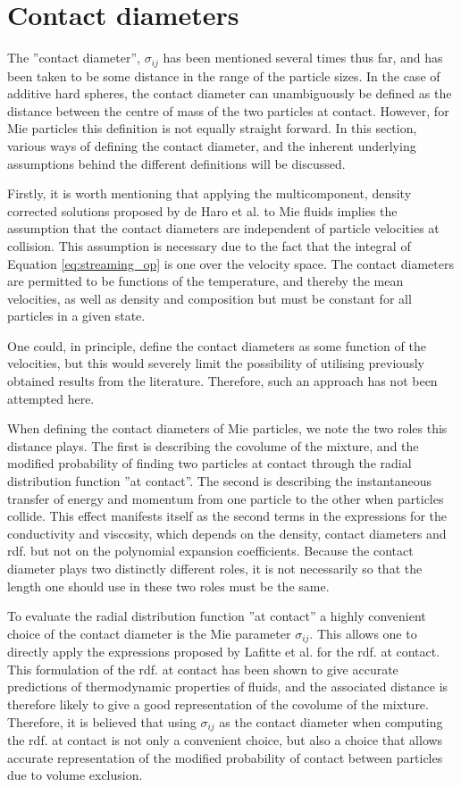 \section{Contact diameters}

The ''contact diameter'', $\sigma_{ij}$ has been mentioned several times thus far, and has been taken to be some distance in the range of the particle sizes. In the case of additive hard spheres, the contact diameter can unambiguously be defined as the distance between the centre of mass of the two particles at contact. However, for Mie particles this definition is not equally straight forward. In this section, various ways of defining the contact diameter, and the inherent underlying assumptions behind the different definitions will be discussed.

Firstly, it is worth mentioning that applying the multicomponent, density corrected solutions proposed by de Haro et al. to Mie fluids implies the assumption that the contact diameters are independent of particle velocities at collision. This assumption is necessary due to the fact that the integral of Equation \eqref{eq:streaming_op} is one over the velocity space. The contact diameters are permitted to be functions of the temperature, and thereby the mean velocities, as well as density and composition but must be constant for all particles in a given state.

One could, in principle, define the contact diameters as some function of the velocities, but this would severely limit the possibility of utilising previously obtained results from the literature. Therefore, such an approach has not been attempted here.

When defining the contact diameters of Mie particles, we note the two roles this distance plays. The first is describing the covolume of the mixture, and the modified probability of finding two particles at contact through the radial distribution function ''at contact''. The second is describing the instantaneous transfer of energy and momentum from one particle to the other when particles collide. This effect manifests itself as the second terms in the expressions for the conductivity and viscosity, which depends on the density, contact diameters and rdf. but not on the polynomial expansion coefficients. Because the contact diameter plays two distinctly different roles, it is not necessarily so that the length one should use in these two roles must be the same.

To evaluate the radial distribution function ''at contact'' a highly convenient choice of the contact diameter is the Mie parameter $\sigma_{ij}$. This allows one to directly apply the expressions proposed by Lafitte et al. for the rdf. at contact.\cite{lafitte2013accurate} This formulation of the rdf. at contact has been shown to give accurate predictions of thermodynamic properties of fluids, and the associated distance is therefore likely to give a good representation of the covolume of the mixture. Therefore, it is believed that using $\sigma_{ij}$ as the contact diameter when computing the rdf. at contact is not only a convenient choice, but also a choice that allows accurate representation of the modified probability of contact between particles due to volume exclusion.

